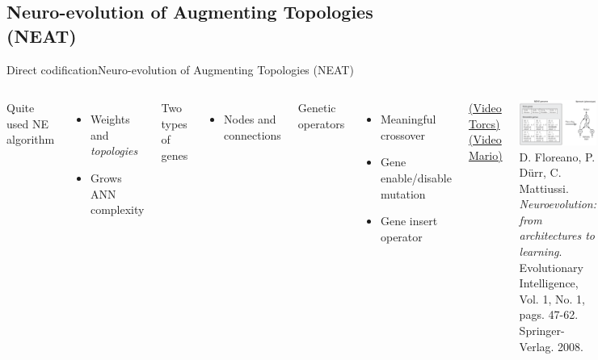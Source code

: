\documentclass[10pt,compress]{beamer} %
\begin{document}
\subsection{Neuro-evolution of Augmenting Topologies (NEAT)}
\begin{frame}{Direct codification}{Neuro-evolution of Augmenting Topologies (NEAT)}
    \begin{columns}
	Quite used NE algorithm
	\begin{itemize}
		\item Weights and \textit{topologies}
		\item Grows ANN complexity
	\end{itemize}
	Two types of genes
	\begin{itemize}
		\item Nodes and connections
	\end{itemize}
	Genetic operators
	\begin{itemize}
		\item Meaningful crossover
		\item Gene enable/disable mutation
		\item Gene insert operator
	\end{itemize}
	\href{https://www.youtube.com/watch?v=3JiNC6vw8zE}{(Video Torcs)}
	\href{https://www.youtube.com/watch?v=tmltm0ZHkHw}{(Video Mario)}
	\begin{center}
	\includegraphics[width=\linewidth]{figs/neat.png}\\
    \tiny{ D. Floreano, P. D\"urr, C. Mattiussi. \textit{Neuroevolution: from architectures to learning}. Evolutionary Intelligence, Vol. 1, No. 1, pags. 47-62. Springer-Verlag. 2008.}
	\end{center}
	\end{columns}
\end{frame}
\end{document}
